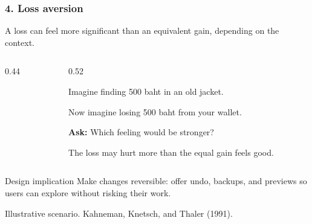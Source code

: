 \documentclass{beamer}
\begin{document}
\begin{frame}
    \frametitle{4. Loss aversion}
    \small
    A loss can feel more significant than an equivalent gain, depending on the context.
    \medskip
    \begin{columns}[c]
    \begin{column}{0.44\textwidth}
    \centering
    \end{column}
    \begin{column}{0.52\textwidth}

        Imagine finding 500 baht in an old jacket.
        \medskip

        Now imagine losing 500 baht from your wallet.
        \medskip

        \textbf{Ask:} Which feeling would be stronger?
        \medskip

        The loss may hurt more than the equal gain feels good.

    \end{column}
    \end{columns}
    \begin{block}{Design implication}
Make changes reversible: offer undo, backups, and previews so users can explore without risking their work.
    \end{block}
    {\tiny Illustrative scenario. Kahneman, Knetsch, and Thaler (1991).}
\end{frame}
\end{document}
